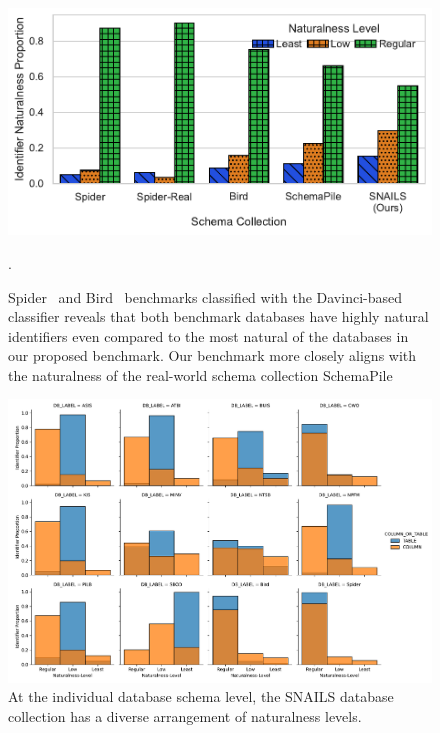 \begin{figure}
  \centering
  \includegraphics[width=\linewidth]{figures/benchmark_naturalness_compare.pdf}
  \caption{Spider~\cite{Yu&al.18c} and Bird~\cite{li2023llm} benchmarks classified with the Davinci-based classifier reveals that both benchmark databases have highly natural identifiers even compared to the most natural of the databases in our proposed benchmark. Our benchmark more closely aligns with the naturalness of the real-world schema collection SchemaPile~\cite{doehmen2024schemapile}}.
  \label{fig:benchmark-naturalness-comparison-appendix}
\end{figure}

\begin{figure}
  \centering
  \includegraphics[width=\textwidth]{figures/database-naturalness-levels-with-benchmarks.pdf}
  \caption{At the individual database schema level, the SNAILS  database collection has a diverse arrangement of naturalness levels.}
  \label{fig:SNAILS-naturalness-db-level}
\end{figure}

